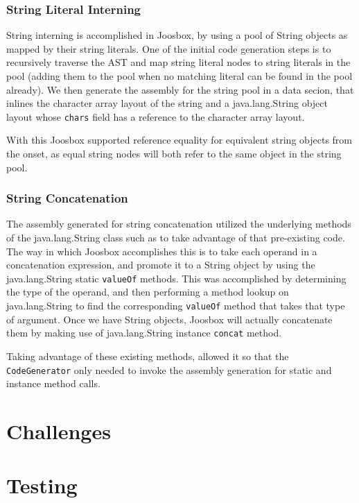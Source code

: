 \documentclass[letterpaper]{article}
\begin{document}
  \subsubsection{String Literal Interning}

  String interning is accomplished in Joosbox, by using a pool of String objects
  as mapped by their string literals. One of the initial code generation steps
  is to recursively traverse the AST and map string literal nodes to string
  literals in the pool (adding them to the pool when no matching literal can be
  found in the pool already). We then generate the assembly for the string pool
  in a data secion, that inlines the character array layout of the string and a
  java.lang.String object layout whose {\tt chars} field has a reference to the
  character array layout.

  With this Joosbox supported reference equality for equivalent string objects
  from the onset, as equal string nodes will both refer to the same object in
  the string pool.

  \subsubsection{String Concatenation}

  The assembly generated for string concatenation utilized the underlying
  methods of the java.lang.String class such as to take advantage of that
  pre-existing code. The way in which Joosbox accomplishes this is to take each
  operand in a concatenation expression, and promote it to a String object by
  using the java.lang.String static {\tt valueOf} methods. This was accomplished
  by determining the type of the operand, and then performing a method lookup on
  java.lang.String to find the corresponding {\tt valueOf} method that takes
  that type of argument. Once we have String objects, Joosbox will actually
  concatenate them by making use of java.lang.String instance {\tt concat}
  method.

  Taking advantage of these existing methods, allowed it so that the {\tt
  CodeGenerator} only needed to invoke the assembly generation for static and
  instance method calls.

  \section{Challenges}


  \section{Testing}
\end{document}
